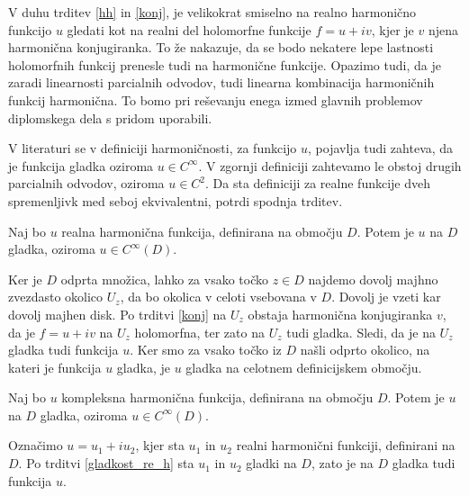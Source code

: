 \documentclass[mat1, tisk]{fmfdelo}
\begin{document}
    V duhu trditev \ref{hh} in \ref{konj}, je velikokrat smiselno na realno harmonično funkcijo $u$ gledati kot na realni del holomorfne funkcije $f = u + iv$, kjer je $v$ njena harmonična konjugiranka. To že nakazuje, da se bodo nekatere lepe lastnosti holomorfnih funkcij prenesle tudi na harmonične funkcije.
    Opazimo tudi, da je zaradi linearnosti parcialnih odvodov, tudi linearna kombinacija harmoničnih funkcij harmonična. To bomo pri reševanju enega izmed glavnih problemov diplomskega dela s pridom uporabili.

    \begin{opomba}
        V literaturi se v definiciji harmoničnosti, za funkcijo $u$, pojavlja tudi zahteva, da je funkcija gladka oziroma $u \in C^{\infty}$. V zgornji definiciji zahtevamo le obstoj drugih parcialnih odvodov, oziroma $u \in C^2$. 
        Da sta definiciji za realne funkcije dveh spremenljivk med seboj ekvivalentni, potrdi spodnja trditev. 
    \end{opomba}
    \begin{trditev}
        \label{gladkost_re_h}
        Naj bo $u$ realna harmonična funkcija, definirana na območju $D$. Potem je $u$ na $D$ gladka, oziroma $u \in C^{\infty}(D)$. 
    \end{trditev}
    \begin{dokaz}
        Ker je  $D$ odprta množica, lahko za vsako točko $z \in D$ najdemo dovolj majhno zvezdasto okolico $U_z$, da bo okolica v celoti vsebovana v $D$. Dovolj je vzeti kar dovolj majhen disk. 
        Po trditvi \ref{konj} na $U_z$ obstaja harmonična konjugiranka $v$, da je $f = u+ iv$ na $U_z$ holomorfna, ter zato na $U_z$ tudi gladka. Sledi, da je na $U_z$ gladka tudi funkcija $u$.
        Ker smo za vsako točko iz $D$ našli odprto okolico, na kateri je funkcija $u$ gladka, je $u$ gladka na celotnem definicijskem območju.
    \end{dokaz}
    \begin{posledica}
        \label{gladkost_komp_h}
        Naj bo $u$ kompleksna harmonična funkcija, definirana na območju $D$. Potem je $u$ na $D$ gladka, oziroma $u \in C^{\infty}(D)$. 
    \end{posledica}
    \begin{dokaz}
        Označimo $u = u_1 + i u_2$, kjer sta $u_1$ in $u_2$ realni harmonični funkciji, definirani na $D$. Po trditvi \ref{gladkost_re_h} sta $u_1$ in $u_2$ gladki na $D$, zato je na $D$ gladka tudi funkcija $u$.
    \end{dokaz}
\end{document}
